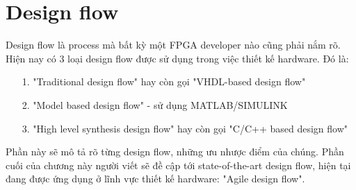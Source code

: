\section{Design flow}
Design flow là process mà bất kỳ một FPGA developer nào cũng phải nắm rõ. Hiện nay có 3 loại design flow được sử dụng trong việc thiết kế hardware. Đó là: 

\begin{itemize}
	\item[1.] "Traditional design flow" hay còn gọi "VHDL-based design flow"
	\item[2.] "Model based design flow" - sử dụng MATLAB/SIMULINK 
	\item[3.] "High level synthesis design flow" hay còn gọi "C/C++ based design flow"
\end{itemize}

Phần này sẽ mô tả rõ từng design flow, những ưu nhược điểm của chúng. Phần cuối của chương này người viết sẽ đề cập tới state-of-the-art design flow, hiện tại đang được ứng dụng ở lĩnh vực thiết kế hardware: "Agile design flow".

